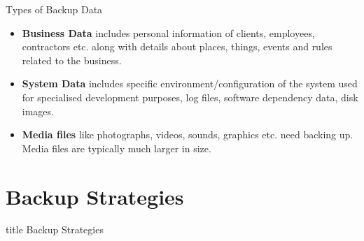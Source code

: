 \documentclass[aspectratio=169, xcolor=dvipsnames]{beamer}
\begin{document}
\begin{frame}{Types of Backup Data}
    \begin{itemize}[<+->]
        \item \textbf{Business Data} includes personal information of clients, employees, contractors etc. along with details about places, things, events and rules related to the business.
        \item \textbf{System Data} includes specific environment/configuration of the system used for specialised development purposes, log files, software dependency data, disk images.
        \item \textbf{Media files} like photographs, videos, sounds, graphics etc. need backing up. Media files are typically much larger in size.
    \end{itemize}
\end{frame}

\section{Backup Strategies}

\begin{frame}
  \vfill
  \centering
  \begin{beamercolorbox}[sep=8pt,center,shadow=true,rounded=true]{title}
    Backup Strategies\par%
  \end{beamercolorbox}
  \vfill
\end{frame}
\end{document}
